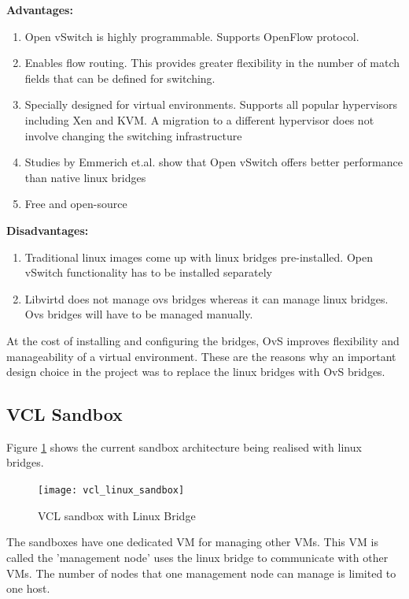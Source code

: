\documentclass[12pt]{extarticle}
\begin{document}
\noindent
\textbf{Advantages:}
\begin{enumerate}
    \item Open vSwitch is highly programmable. Supports OpenFlow protocol.
    \item Enables flow routing. This provides greater flexibility in the number of match fields that can be defined for switching. 
    \item Specially designed for virtual environments. Supports all popular hypervisors including Xen and KVM. A migration to a different hypervisor does not involve changing the switching infrastructure
    \item Studies by Emmerich et.al. \cite{6968979} show that Open vSwitch offers better performance than native linux bridges
    \item Free and open-source
\end{enumerate}

\noindent
\textbf{Disadvantages:}
\begin{enumerate}
    \item Traditional linux images come up with linux bridges pre-installed. Open vSwitch functionality has to be installed separately
    \item Libvirtd does not manage ovs bridges whereas it can manage linux bridges. Ovs bridges will have to be managed manually.
\end{enumerate}

At the cost of installing and configuring the bridges, OvS improves flexibility and manageability of a virtual environment. These are the reasons why an important design choice in the project was to replace the linux bridges with OvS bridges.


\subsection{VCL Sandbox}

Figure \ref{fig:vcllinux} shows the current sandbox architecture being realised with linux bridges.
\begin{figure}[H]
\centering
\texttt{[image: vcl\_linux\_sandbox]}
\caption{VCL sandbox with Linux Bridge}
\label{fig:vcllinux}
\end{figure}

The sandboxes have one dedicated VM for managing other VMs. This VM is called the 'management node' uses the linux bridge to communicate with other VMs. The number of nodes that one management node can manage is limited to one host.
\end{document}
